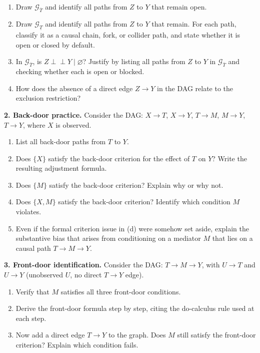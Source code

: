 \documentclass[
  a4paper,
]{book}
\providecommand{\tightlist}{%
  \setlength{\itemsep}{0pt}\setlength{\parskip}{0pt}}
\newcommand{\indep}{\perp\!\!\!\perp}
\newcommand{\Gcal}{\mathcal{G}}
\begin{document}
\begin{enumerate}
\def\labelenumi{(\alph{enumi})}
\tightlist
\item
  Draw \(\Gcal_{\overline{T}}\) and identify all paths from \(Z\) to
  \(Y\) that remain open.
\item
  Draw \(\Gcal_{\underline{T}}\) and identify all paths from \(Z\) to
  \(Y\) that remain. For each path, classify it as a causal chain, fork,
  or collider path, and state whether it is open or closed by default.
\item
  In \(\Gcal_{\overline{T}}\), is \(Z \indep Y \mid \varnothing\)?
  Justify by listing all paths from \(Z\) to \(Y\) in
  \(\Gcal_{\overline{T}}\) and checking whether each is open or blocked.
\item
  How does the absence of a direct edge \(Z \to Y\) in the DAG relate to
  the exclusion restriction?
\end{enumerate}

\textbf{2. Back-door practice.} Consider the DAG: \(X \to T\),
\(X \to Y\), \(T \to M\), \(M \to Y\), \(T \to Y\), where \(X\) is
observed.

\begin{enumerate}
\def\labelenumi{(\alph{enumi})}
\tightlist
\item
  List all back-door paths from \(T\) to \(Y\).
\item
  Does \(\{X\}\) satisfy the back-door criterion for the effect of \(T\)
  on \(Y\)? Write the resulting adjustment formula.
\item
  Does \(\{M\}\) satisfy the back-door criterion? Explain why or why
  not.
\item
  Does \(\{X, M\}\) satisfy the back-door criterion? Identify which
  condition \(M\) violates.
\item
  Even if the formal criterion issue in (d) were somehow set aside,
  explain the substantive bias that arises from conditioning on a
  mediator \(M\) that lies on a causal path \(T \to M \to Y\).
\end{enumerate}

\textbf{3. Front-door identification.} Consider the DAG:
\(T \to M \to Y\), with \(U \to T\) and \(U \to Y\) (unobserved \(U\),
no direct \(T \to Y\) edge).

\begin{enumerate}
\def\labelenumi{(\alph{enumi})}
\tightlist
\item
  Verify that \(M\) satisfies all three front-door conditions.
\item
  Derive the front-door formula step by step, citing the do-calculus
  rule used at each step.
\item
  Now add a direct edge \(T \to Y\) to the graph. Does \(M\) still
  satisfy the front-door criterion? Explain which condition fails.
\end{enumerate}
\end{document}
